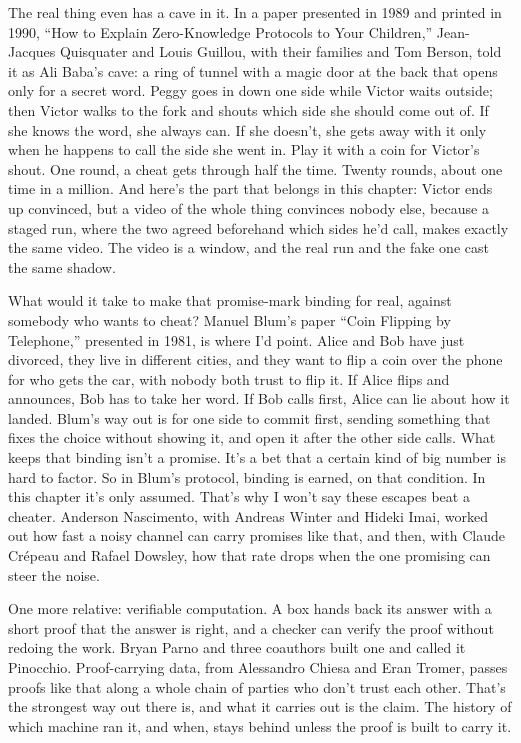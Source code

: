 \documentclass[11pt,twoside]{article}
\theoremstyle{thielethm}
\theoremstyle{thieledef}
\theoremstyle{thieledef}
\theoremstyle{thieledef}
\theoremstyle{thielethm}
\theoremstyle{thieleobs}
\theoremstyle{thielethm}
\begin{document}
The real thing even has a cave in it. In a paper presented in 1989 and printed in 1990, ``How to Explain Zero-Knowledge Protocols to Your Children,'' Jean-Jacques Quisquater and Louis Guillou, with their families and Tom Berson, told it as Ali Baba's cave: a ring of tunnel with a magic door at the back that opens only for a secret word. Peggy goes in down one side while Victor waits outside; then Victor walks to the fork and shouts which side she should come out of. If she knows the word, she always can. If she doesn't, she gets away with it only when he happens to call the side she went in. Play it with a coin for Victor's shout. One round, a cheat gets through half the time. Twenty rounds, about one time in a million. And here's the part that belongs in this chapter: Victor ends up convinced, but a video of the whole thing convinces nobody else, because a staged run, where the two agreed beforehand which sides he'd call, makes exactly the same video. The video is a window, and the real run and the fake one cast the same shadow.

What would it take to make that promise-mark binding for real, against somebody who wants to cheat? Manuel Blum's paper ``Coin Flipping by Telephone,'' presented in 1981, is where I'd point. Alice and Bob have just divorced, they live in different cities, and they want to flip a coin over the phone for who gets the car, with nobody both trust to flip it. If Alice flips and announces, Bob has to take her word. If Bob calls first, Alice can lie about how it landed. Blum's way out is for one side to commit first, sending something that fixes the choice without showing it, and open it after the other side calls. What keeps that binding isn't a promise. It's a bet that a certain kind of big number is hard to factor. So in Blum's protocol, binding is earned, on that condition. In this chapter it's only assumed. That's why I won't say these escapes beat a cheater. Anderson Nascimento, with Andreas Winter and Hideki Imai, worked out how fast a noisy channel can carry promises like that, and then, with Claude Crépeau and Rafael Dowsley, how that rate drops when the one promising can steer the noise.

One more relative: verifiable computation. A box hands back its answer with a short proof that the answer is right, and a checker can verify the proof without redoing the work. Bryan Parno and three coauthors built one and called it Pinocchio. Proof-carrying data, from Alessandro Chiesa and Eran Tromer, passes proofs like that along a whole chain of parties who don't trust each other. That's the strongest way out there is, and what it carries out is the claim. The history of which machine ran it, and when, stays behind unless the proof is built to carry it.
\end{document}

